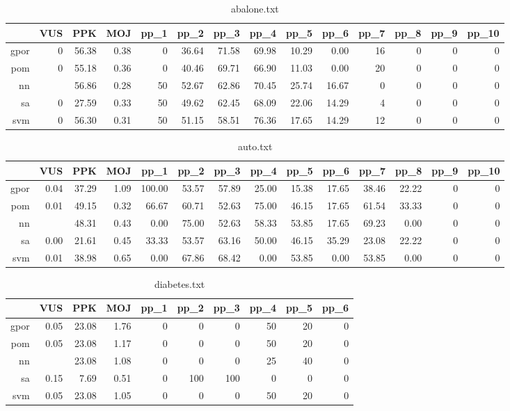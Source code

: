\documentclass{mini}
\begin{document}
\begin{table}[ht]
\centering
\begin{tabular}{rrrrrrrrrrrrrr}
\hline
& VUS & PPK & MOJ & pp\_1 & pp\_2 & pp\_3 & pp\_4 & pp\_5 & pp\_6 & pp\_7 & pp\_8 & pp\_9 & pp\_10 \\
\hline
gpor & 0 & 56.38 & 0.38 & 0 & 36.64 & 71.58 & 69.98 & 10.29 & 0.00 & 16 & 0 & 0 & 0 \\
pom & 0 & 55.18 & 0.36 & 0 & 40.46 & 69.71 & 66.90 & 11.03 & 0.00 & 20 & 0 & 0 & 0 \\
nn & & 56.86 & 0.28 & 50 & 52.67 & 62.86 & 70.45 & 25.74 & 16.67 & 0 & 0 & 0 & 0 \\
sa & 0 & 27.59 & 0.33 & 50 & 49.62 & 62.45 & 68.09 & 22.06 & 14.29 & 4 & 0 & 0 & 0 \\
svm & 0 & 56.30 & 0.31 & 50 & 51.15 & 58.51 & 76.36 & 17.65 & 14.29 & 12 & 0 & 0 & 0 \\
\hline
\end{tabular}
\caption{abalone.txt}
\end{table}
\begin{table}[ht]
\centering
\begin{tabular}{rrrrrrrrrrrrrr}
\hline
& VUS & PPK & MOJ & pp\_1 & pp\_2 & pp\_3 & pp\_4 & pp\_5 & pp\_6 & pp\_7 & pp\_8 & pp\_9 & pp\_10 \\
\hline
gpor & 0.04 & 37.29 & 1.09 & 100.00 & 53.57 & 57.89 & 25.00 & 15.38 & 17.65 & 38.46 & 22.22 & 0 & 0 \\
pom & 0.01 & 49.15 & 0.32 & 66.67 & 60.71 & 52.63 & 75.00 & 46.15 & 17.65 & 61.54 & 33.33 & 0 & 0 \\
nn & & 48.31 & 0.43 & 0.00 & 75.00 & 52.63 & 58.33 & 53.85 & 17.65 & 69.23 & 0.00 & 0 & 0 \\
sa & 0.00 & 21.61 & 0.45 & 33.33 & 53.57 & 63.16 & 50.00 & 46.15 & 35.29 & 23.08 & 22.22 & 0 & 0 \\
svm & 0.01 & 38.98 & 0.65 & 0.00 & 67.86 & 68.42 & 0.00 & 53.85 & 0.00 & 53.85 & 0.00 & 0 & 0 \\
\hline
\end{tabular}
\caption{auto.txt}
\end{table}
\begin{table}[ht]
\centering
\begin{tabular}{rrrrrrrrrr}
\hline
& VUS & PPK & MOJ & pp\_1 & pp\_2 & pp\_3 & pp\_4 & pp\_5 & pp\_6 \\
\hline
gpor & 0.05 & 23.08 & 1.76 & 0 & 0 & 0 & 50 & 20 & 0 \\
pom & 0.05 & 23.08 & 1.17 & 0 & 0 & 0 & 50 & 20 & 0 \\
nn & & 23.08 & 1.08 & 0 & 0 & 0 & 25 & 40 & 0 \\
sa & 0.15 & 7.69 & 0.51 & 0 & 100 & 100 & 0 & 0 & 0 \\
svm & 0.05 & 23.08 & 1.05 & 0 & 0 & 0 & 50 & 20 & 0 \\
\hline
\end{tabular}
\caption{diabetes.txt}
\end{table}
\end{document}
